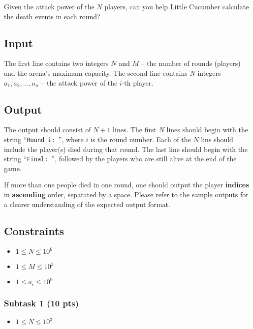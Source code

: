 Given the attack power of the $N$ players, can you help Little Cucumber calculate the death events in each round?

\subsection{Input}\label{input}

The first line contains two integers $N$ and $M$ -- the number of rounds (players) and the arena's maximum capacity. 
The second line contains $N$ integers $a_1, a_2, \dots, a_n$ -- the attack power of the $i$-th player.

\subsection{Output}\label{output}

The output should consist of $N+1$ lines. The first $N$ lines should begin with the string ``\texttt{Round i: }'', where $i$ is the round number. Each of the $N$ lins should include the player(s) died during that round. The last line should begin with the string ``\texttt{Final: }'', followed by the players who are still alive at the end of the game.

If more than one people died in one round, one should output the player \textbf{indices} in \textbf{ascending} order, separated by a space. Please refer to the sample outputs for a clearer understanding of the expected output format. 

\subsection{Constraints} \label{constraint}
\begin{itemize}
\tightlist
    \item $1 \le N \le 10^6$
    \item $1 \le M \le 10^3$
    \item $1 \le a_i \le 10^9$
\end{itemize}

\subsubsection{Subtask 1 (10 pts)}\label{subtask-1}

\begin{itemize}
\tightlist
\item $1 \le N \le 10^3$
\end{itemize}

